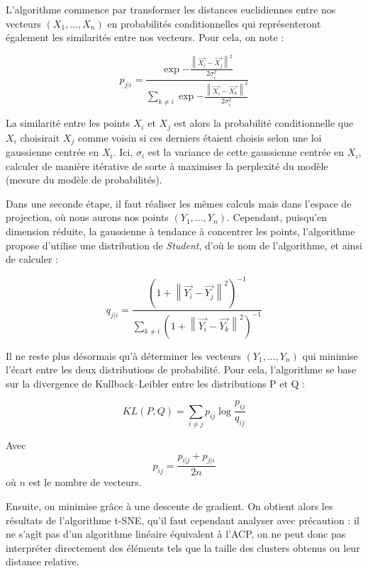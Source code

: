 \documentclass[11pt,french,french]{article}
\begin{document}
L'algorithme commence par transformer les distances euclidiennes entre
nos vecteurs \((X_1,...,X_n)\) en probabilités conditionnelles qui
représenteront également les similarités entre nos vecteurs. Pour cela,
on note :

\[ p_{j|i} = \frac{\exp{-\frac{\left\| \vec{X_i} - \vec{X_j}  \right\|^2}{2\sigma_i^2}}}{\sum_{k \neq i}{\exp{-\frac{\left\| \vec{X_i} - \vec{X_k}  \right\|^2}{2\sigma_i^2}}}}\]

La similarité entre les points \(X_i\) et \(X_j\) est alors la
probabilité conditionnelle que \(X_i\) choisirait \(X_j\) comme voisin
si ces derniers étaient choisis selon une loi gaussienne centrée en
\(X_i\). Ici, \(\sigma_i\) est la variance de cette gaussienne centrée
en \(X_i\), calculer de manière itérative de sorte à maximiser la
perplexité du modèle (mesure du modèle de probabilités).

Dans une seconde étape, il faut réaliser les mêmes calculs mais dans
l'espace de projection, où nous aurons nos points \((Y_1,..., Y_n)\).
Cependant, puisqu'en dimension réduite, la gaussienne à tendance à
concentrer les points, l'algorithme propose d'utilise une distribution
de \emph{Student}, d'où le nom de l'algorithme, et ainsi de calculer :

\[ q_{j|i} = \frac{(1+\left\| \vec{Y_i} - \vec{Y_j}  \right\|^2)^{-1}}{\sum_{k \neq i}{(1+\left\| \vec{Y_i} - \vec{Y_k}  \right\|^2)^{-1}}}\]

Il ne reste plus désormais qu'à déterminer les vecteurs
\((Y_1,...,Y_n)\) qui minimise l'écart entre les deux distributions de
probabilité. Pour cela, l'algorithme se base sur la divergence de
Kullback--Leibler entre les distributions P et Q :

\[KL(P,Q) = \sum_{i \neq j} { p_{ij} \log{\frac{p_{ij}}{q_{ij}}}}\]

Avec \[p_{ij} = \frac{p_{i|j} + p_{j|i}}{2n}\] où \(n\) est le nombre de
vecteurs.

Ensuite, on minimise grâce à une descente de gradient. On obtient alors
les résultats de l'algorithme t-SNE, qu'il faut cependant analyser avec
précaution : il ne s'agît pas d'un algorithme linéaire équivalent à
l'ACP, on ne peut donc pas interpréter directement des éléments tels que
la taille des clusters obtenus ou leur distance relative.
\end{document}
